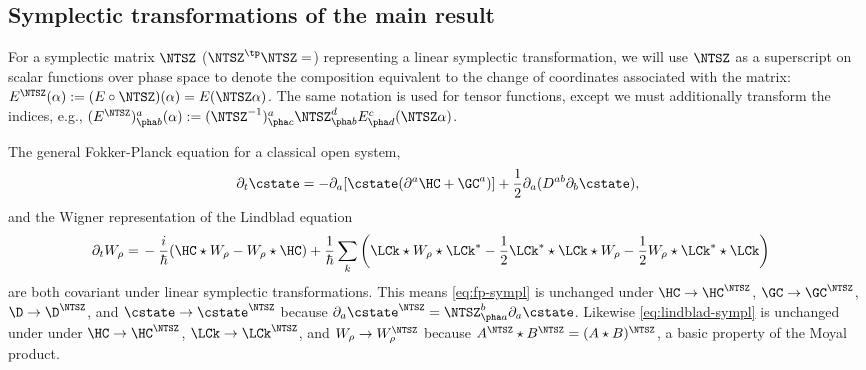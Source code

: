 \documentclass{article}
\numberwithin{equation}{section}
\begin{document}
\subsection{Symplectic transformations of the main result}


For a symplectic matrix $\NTSZ$ ($\NTSZ^\tp\sf\NTSZ=\sf$) representing a linear symplectic transformation, we will use $\NTSZ$ as a superscript on scalar functions over phase space to denote the composition equivalent to the change of coordinates associated with the matrix: $E^\NTSZ(\alpha) := (E\circ\NTSZ)(\alpha) = E(\NTSZ\alpha)$. The same notation is used for tensor functions, except we must additionally transform the indices, e.g., $(E^\NTSZ)^{a}_{\pha b}(\alpha) := (\NTSZ^{-1})^{a}_{\pha c} \NTSZ^d_{\pha b} E^{c}_{\pha d}(\NTSZ\alpha)$.  

The general Fokker-Planck equation for a classical open system,
\begin{equation}
    \label{eq:fp-sympl}
    \partial_t \cstate = -\partial_a [\cstate (\partial^a \HC + \GC^a)]  +	 \frac12 \partial_a (D^{ab} \partial_b \cstate),
\end{equation}
and the Wigner representation of the Lindblad equation
\begin{align}
    \label{eq:lindblad-sympl}
	\partial_t W_\rho 
	=&\, -\frac{i}{\hbar} (\HC \star W_\rho - W_\rho \star \HC)  + \frac{1}{\hbar }\sum_k \left( \LCk  \star W_\rho \star \LCk^* - \frac{1}{2} \LCk^* \star \LCk \star W_\rho - \frac{1}{2} W_\rho\star \LCk^* \star \LCk   \right)
\end{align}
are both covariant under linear symplectic transformations. 
This means \eqref{eq:fp-sympl} is unchanged under $\HC \to \HC^\NTSZ$, $\GC \to \GC^\NTSZ$, $\D \to \D^\NTSZ$, and $\cstate\to \cstate^\NTSZ$ because $\partial_a \cstate^\NTSZ = \NTSZ^b_{\pha a} \partial_a \cstate$. 
Likewise \eqref{eq:lindblad-sympl} is unchanged under under $\HC \to \HC^\NTSZ$, $\LCk \to \LCk^\NTSZ$, and $W_\rho \to W_\rho^\NTSZ$ because $A^\NTSZ \star B^\NTSZ = (A \star B)^\NTSZ$, a basic property of the Moyal product.
\end{document}

